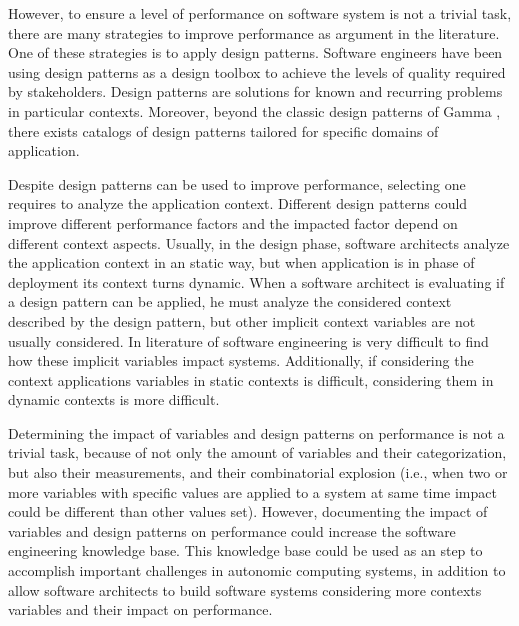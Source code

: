 However, to ensure a level of performance on software system is not a trivial task,  there are many strategies to improve performance as argument in the literature. One of these strategies is to apply design patterns. Software engineers have been using design patterns as a design toolbox to achieve the levels of quality required by stakeholders. Design patterns are solutions for known and recurring problems in particular contexts. Moreover, beyond the classic design patterns of Gamma \etal{} \cite{Gamma:1995:DesignPatternsBook}, there exists catalogs of design patterns tailored for specific domains of application.

Despite design patterns can be used to improve performance, selecting one requires to analyze the application context. Different design patterns could improve different performance factors and the impacted factor depend on different context aspects. Usually, in the design phase, software architects analyze the application context in an static way, but when application is in phase of deployment its context turns dynamic. When a software architect is evaluating if a design pattern can be applied, he must analyze the considered context described by the design pattern, but other implicit context variables are not usually considered. In literature of software engineering is very difficult to find how these implicit variables impact systems. Additionally, if considering the context applications variables in static contexts is difficult, considering them in dynamic contexts is more difficult.


Determining the impact of variables and design patterns on performance is not a trivial task, because of not only the amount of variables and their categorization, but also their measurements, and their combinatorial explosion (i.e., when two or more variables with specific values are applied to a system at same time impact could be different than other values set). However, documenting the impact of variables and design patterns on performance could increase the software engineering knowledge base. This knowledge base  could be used as an step to accomplish important challenges in autonomic computing systems, in addition to allow software architects to build software systems considering more contexts variables and their impact on performance.

